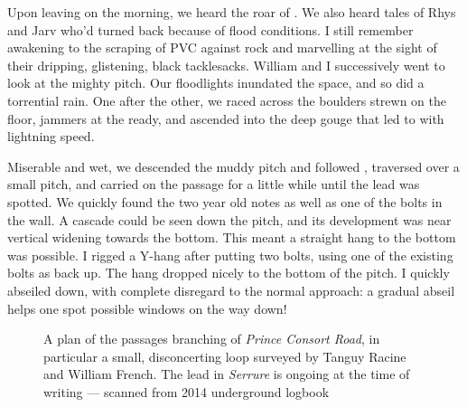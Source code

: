 \begin{marginfigure}
\end{marginfigure}

Upon leaving  on the morning, we heard the roar of . We also heard tales of Rhys and Jarv who'd turned back because of flood conditions. I still remember awakening to the scraping of PVC against rock and marvelling at  the sight of their dripping, glistening, black tacklesacks. William and I successively went to look at the mighty  pitch. Our floodlights inundated the space, and so did a torrential rain. One after the other, we raced across the boulders strewn on the floor, jammers at the ready, and ascended into the deep gouge that led to  with lightning speed.

Miserable and wet, we descended the muddy pitch and followed , traversed over a small pitch, and carried on the passage for a little while until the  lead was spotted. We quickly found the two year old notes as well as one of the bolts in the wall. A cascade could be seen down the pitch, and its development was near vertical widening towards the bottom. This meant a straight hang to the bottom was possible. I rigged a Y-hang after putting two bolts, using one of the existing bolts as back up. The hang dropped nicely to the bottom of the pitch. I quickly abseiled down, with complete disregard to the normal approach: a gradual abseil helps one spot possible windows on the way down! 

\begin{figure}[t]
	\checkoddpage \ifoddpage \forcerectofloat \else \forceversofloat \fi
    		\centering
    
   		\caption{A plan of the passages branching of \emph{Prince Consort Road}, in particular a small, disconcerting loop surveyed by Tanguy Racine and William French. The lead in \emph{Serrure} is ongoing at the time of writing
    		 --- scanned from 2014 underground logbook}
		 \label{serrure scan}
\end{figure}

